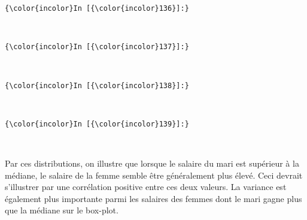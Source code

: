 \documentclass[11pt]{article}
\begin{document}
    \begin{Verbatim}[commandchars=\\\{\}]
{\color{incolor}In [{\color{incolor}136}]:} 
\end{Verbatim}


    \begin{center}
    \end{center}
    { \hspace*{\fill} \\}
    
    \begin{Verbatim}[commandchars=\\\{\}]
{\color{incolor}In [{\color{incolor}137}]:} 
\end{Verbatim}


    \begin{center}
    \end{center}
    { \hspace*{\fill} \\}
    
    \begin{Verbatim}[commandchars=\\\{\}]
{\color{incolor}In [{\color{incolor}138}]:} 
\end{Verbatim}


    \begin{center}
    \end{center}
    { \hspace*{\fill} \\}
    
    \begin{Verbatim}[commandchars=\\\{\}]
{\color{incolor}In [{\color{incolor}139}]:} 
\end{Verbatim}


    \begin{center}
    \end{center}
    { \hspace*{\fill} \\}
    
    Par ces distributions, on illustre que lorsque le salaire du mari est
supérieur à la médiane, le salaire de la femme semble être généralement
plus élevé. Ceci devrait s'illustrer par une corrélation positive entre
ces deux valeurs. La variance est également plus importante parmi les
salaires des femmes dont le mari gagne plus que la médiane sur le
box-plot.
\end{document}
